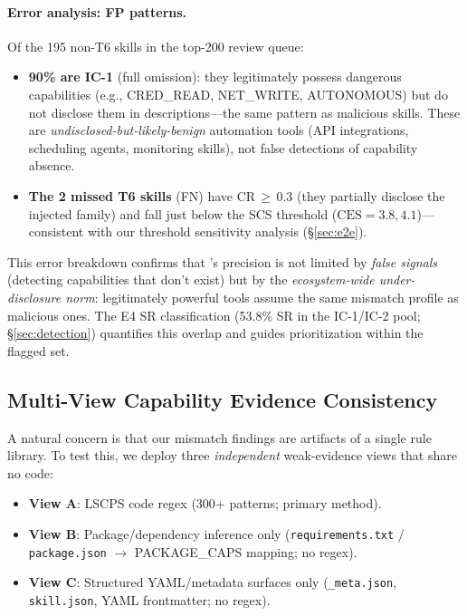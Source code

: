 \paragraph{Error analysis: FP patterns.}
Of the 195 non-T6 skills in the top-200 review queue:
\begin{itemize}[topsep=2pt,itemsep=0pt]
\item \textbf{90\% are IC-1} (full omission): they legitimately possess
  dangerous capabilities (e.g., CRED\_READ, NET\_WRITE, AUTONOMOUS)
  but do not disclose them in descriptions---the same pattern
  as malicious skills. These are \emph{undisclosed-but-likely-benign}
  automation tools (API integrations, scheduling agents, monitoring skills),
  not false detections of capability absence.
\item \textbf{The 2 missed T6 skills} (FN) have CR\,$\geq$\,0.3
  (they partially disclose the injected family) and fall just
  below the SCS threshold ($\text{CES}=3.8, 4.1$)---consistent
  with our threshold sensitivity analysis (\S\ref{sec:e2e}).
\end{itemize}
\noindent
This error breakdown confirms that \sysname's precision is not limited by
\emph{false signals} (detecting capabilities that don't exist) but by the
\emph{ecosystem-wide under-disclosure norm}: legitimately powerful tools
assume the same mismatch profile as malicious ones.
The E4 SR classification (53.8\% SR in the IC-1/IC-2 pool; \S\ref{sec:detection})
quantifies this overlap and guides prioritization within the flagged set.

\subsection{Multi-View Capability Evidence Consistency}
\label{sec:multiview}

A natural concern is that our mismatch findings are artifacts of a single
rule library. To test this, we deploy three \emph{independent} weak-evidence
views that share no code:

\begin{itemize}[topsep=2pt,itemsep=1pt]
\item \textbf{View A}: LSCPS code regex (300+ patterns; primary method).
\item \textbf{View B}: Package/dependency inference only
  (\texttt{requirements.txt} / \texttt{package.json} $\to$ PACKAGE\_CAPS mapping;
  no regex).
\item \textbf{View C}: Structured YAML/metadata surfaces only
  (\texttt{\_meta.json}, \texttt{skill.json}, YAML frontmatter;
  no regex).
\end{itemize}

